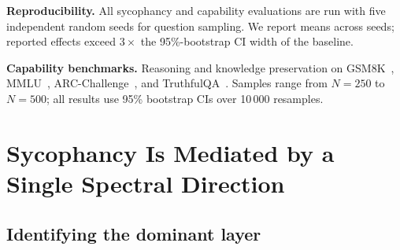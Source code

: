 \documentclass{article}
\begin{document}
\textbf{Reproducibility.} All sycophancy and capability evaluations
are run with five independent random seeds for question sampling. We
report means across seeds; reported effects exceed $3\times$ the
95\%-bootstrap CI width of the baseline.

\textbf{Capability benchmarks.} Reasoning and knowledge preservation
on GSM8K~\citep{cobbeTrainingVerifiersSolve2021},
MMLU~\citep{hendryksScalingInstructionFinetunedLanguage2022},
ARC-Challenge~\citep{clarkThinkYouHave2018}, and
TruthfulQA~\citep{linTruthfulQAMeasuringHow2022}. Samples range
from $N{=}250$ to $N{=}500$; all results use 95\% bootstrap CIs over
10\,000 resamples.

\section{Sycophancy Is Mediated by a Single Spectral Direction}
\label{sec:direction}

\subsection{Identifying the dominant layer}
\label{sec:layer_id}
\end{document}
